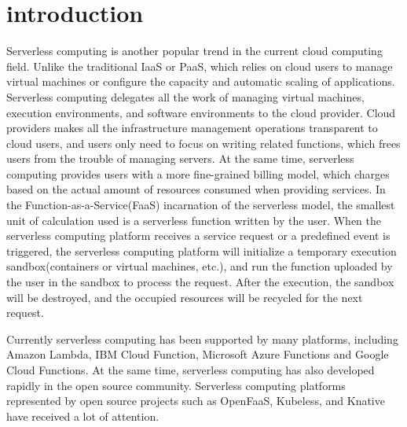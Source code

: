 \section{introduction}

Serverless computing is another popular trend in the current cloud computing field.
Unlike the traditional IaaS\cite{iaas} or PaaS\cite{paas},
which relies on cloud users to manage virtual machines or configure the capacity and automatic scaling of applications.
Serverless computing delegates all the work of managing virtual machines, execution environments, and software environments to the cloud provider.
Cloud providers makes all the infrastructure management operations transparent to cloud users,
and users only need to focus on writing related functions, which frees users from the trouble of managing servers.
At the same time, serverless computing provides users with a more fine-grained billing model,
which charges based on the actual amount of resources consumed when providing services.
In the Function-as-a-Service(FaaS)\cite{berkeley-view} incarnation of the serverless model,
the smallest unit of calculation used is a serverless function written by the user.
When the serverless computing platform receives a service request or a predefined event is triggered,
the serverless computing platform will initialize a temporary execution sandbox(containers or virtual machines, etc.),
and run the function uploaded by the user in the sandbox to process the request. After the execution, the sandbox will be destroyed,
and the occupied resources will be recycled for the next request.

Currently serverless computing has been supported by many platforms, including Amazon Lambda\cite{amazon}, IBM Cloud Function\cite{ibm},
Microsoft Azure Functions\cite{microsoft} and Google Cloud Functions\cite{google}.
At the same time, serverless computing has also developed rapidly in the open source community.
Serverless computing platforms represented by open source projects such as OpenFaaS\cite{openfaas}, Kubeless\cite{kubeless}, and Knative\cite{knative} have received a lot of attention.

